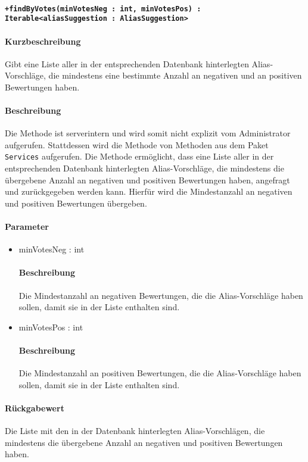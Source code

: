 \paragraph*{\texttt{+findByVotes(minVotesNeg : int, minVotesPos) : Iterable<aliasSuggestion : AliasSuggestion>}}%
\paragraph*{Kurzbeschreibung}
Gibt eine Liste aller in der entsprechenden Datenbank hinterlegten Alias-Vorschläge, die mindestens eine bestimmte Anzahl an negativen und an positiven Bewertungen haben.
\paragraph*{Beschreibung}
Die Methode ist serverintern und wird somit nicht explizit vom Administrator aufgerufen.
Stattdessen wird die Methode von Methoden aus dem Paket \texttt{Services} aufgerufen.
Die Methode ermöglicht, dass eine Liste aller in der entsprechenden Datenbank hinterlegten Alias-Vorschläge, die mindestens die übergebene Anzahl an negativen und positiven Bewertungen haben, angefragt und zurückgegeben werden kann.
Hierfür wird die Mindestanzahl an negativen und positiven Bewertungen übergeben.
\paragraph*{Parameter}
\begin{itemize}
    \item minVotesNeg : int
    		\paragraph*{Beschreibung}
    		Die Mindestanzahl an negativen Bewertungen, die die Alias-Vorschläge haben sollen, damit sie in der Liste enthalten sind.
    	\item minVotesPos : int
    		\paragraph*{Beschreibung}
    		Die Mindestanzahl an positiven Bewertungen, die die Alias-Vorschläge haben sollen, damit sie in der Liste enthalten sind.
\end{itemize}
\paragraph*{Rückgabewert}
Die Liste mit den in der Datenbank hinterlegten Alias-Vorschlägen, die mindestens die übergebene Anzahl an negativen und positiven Bewertungen haben.
